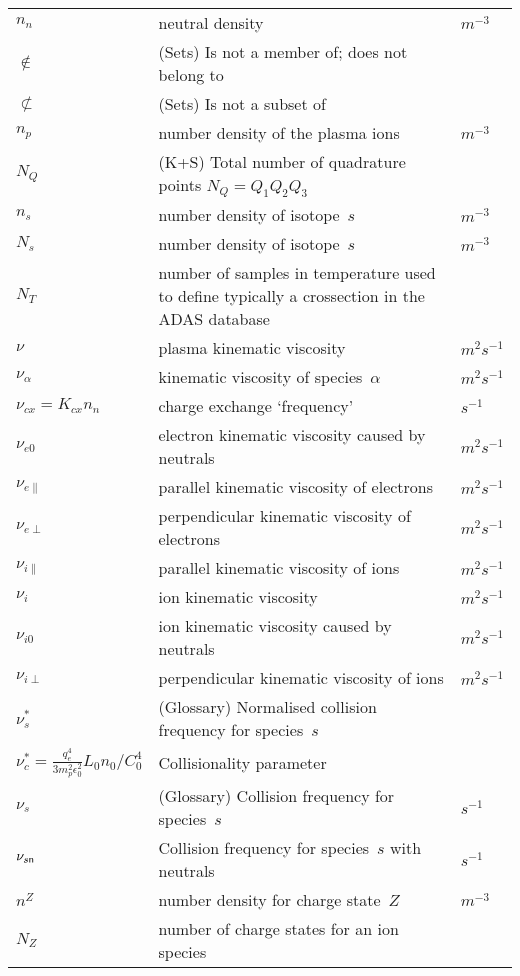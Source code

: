 \begin{longtable}{|p{3.0cm}|p{10.0cm}|p{3.0cm}|}
$n_n$ & neutral density & $m^{-3}$ \\
$\notin$ &  (Sets) Is not a member of; does not belong to & \\
$\not\subset$ &  (Sets) Is not a subset of & \\
$n_p$ & number density of the plasma ions & $m^{-3}$ \\
$N_{Q}$ &  (K+S) Total number of quadrature points $N_Q = Q_1 Q_2 Q_3$ & \\
$n_s$ & number density of isotope~$s$ & $m^{-3}$ \\
$N_s$ & number density of isotope~$s$ & $m^{-3}$ \\
$N_T$ & number of samples in temperature used to define typically a crossection in the ADAS database~\cite{adaswebsite,openadaswebsite} & \\
$\nu$ & plasma kinematic viscosity & $m^2 s^{-1}$ \\
$\nu_\alpha$ & kinematic viscosity of species~$\alpha$ & $m^2 s^{-1}$ \\
$\nu_{cx}=K_{cx} n_n$ & charge exchange `frequency'  & $s^{-1}$ \\
$\nu_{e0}$ & electron kinematic viscosity caused by neutrals & $m^2 s^{-1}$ \\
$\nu_{e\|}$ & parallel kinematic viscosity of electrons & $m^2 s^{-1}$ \\
$\nu_{e\perp}$ & perpendicular kinematic viscosity of electrons & $m^2 s^{-1}$ \\
$\nu_{i\|}$ & parallel kinematic viscosity of ions & $m^2 s^{-1}$ \\
$\nu_i$ & ion kinematic viscosity & $m^2 s^{-1}$ \\
$\nu_{i0}$ & ion kinematic viscosity caused by neutrals & $m^2 s^{-1}$ \\
$\nu_{i\perp}$ & perpendicular kinematic viscosity of ions & $m^2 s^{-1}$ \\
$\nu^{*}_s$ & (Glossary) Normalised collision frequency for species~$s$ & \\
$\nu^{*}_c = \frac{q_e^4}{3 m_p^2\epsilon_0^2} L_0 n_0 /C_0^4$ & Collisionality parameter & \\
$\nu_s$ & (Glossary) Collision frequency for species~$s$ & $s^{-1}$ \\
$\nu_{s{\sf n}}$ & Collision frequency for species~$s$ with neutrals & $s^{-1}$ \\
$n^Z$ & number density for charge state~$Z$  & $m^{-3}$ \\
$N_Z$ & number of charge states for an ion species & \\

\end{longtable}
